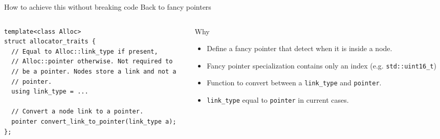 \documentclass[10pt,aspectratio=169]{beamer}
\begin{document}
\begin{frame}[fragile]
{How to achieve this without breaking code}
{Back to fancy pointers}

\begin{columns}
\begin{column}{0.60\textwidth}
\begin{lstlisting}
template<class Alloc>
struct allocator_traits {
  // Equal to Alloc::link_type if present,
  // Alloc::pointer otherwise. Not required to
  // be a pointer. Nodes store a link and not a
  // pointer.
  using link_type = ...

  // Convert a node link to a pointer.
  pointer convert_link_to_pointer(link_type a);
};
\end{lstlisting}
\end{column}

\begin{column}{0.40\textwidth}
\begin{block}{Why}
\begin{itemize}
\item Define a fancy pointer that detect when
it is inside a node.
\item Fancy pointer specialization contains
only an index (e.g. \texttt{std::uint16\_t})
\item Function to convert between a \texttt{link\_type}
and \texttt{pointer}.
\item \texttt{link\_type} equal to \texttt{pointer}
in current cases.
\end{itemize}
\end{block}
\end{column}

\end{columns}

\end{frame}
\end{document}
